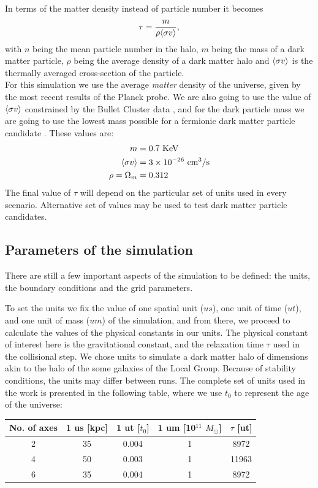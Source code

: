 In terms of the matter density instead of particle number it becomes
\begin{equation}
\tau = \frac{m}{\rho \langle \sigma v \rangle},
\end{equation}
with $n$ being the mean particle number in the halo, $m$ being the mass of a dark matter particle, $\rho$ being the average density of a dark matter halo and $\langle \sigma v \rangle$ is the thermally averaged cross-section of the particle.\\
For this simulation we use the average \emph{matter} density of the universe, given by the most recent results of the Planck probe\cite{2018arXiv180706209P}. We are also going to use the value of $\langle \sigma v \rangle$  constrained by the Bullet Cluster data \cite{2008ApJ6791173R} \cite{2017MNRAS465569R}, and for the dark particle mass we are going to use the lowest mass possible for a fermionic dark matter particle candidate \cite{mariangela}. These values are:
\begin{align}
m &= 0.7 \ \text{KeV} \\
\langle \sigma v \rangle &= 3 \times 10^{-26} \ \text{cm}^3 / \text{s}\\
\rho = \Omega_m &= 0.312  
\end{align}
The final value of $\tau$ will depend on the particular set of units used in every scenario. Alternative set of values may be used to test dark matter particle candidates.

\subsection{Parameters of the simulation}
There are still a few important aspects of the simulation to be defined: the units, the boundary conditions and the grid parameters.

To set the units we fix the value of one spatial unit ($us$), one unit of time ($ut$), and one unit of mass ($um$) of the simulation, and from there, we proceed to calculate the values of the physical constants in our units. 
The physical constant of interest here is the gravitational constant, and the relaxation time $\tau$ used in the collisional step.
We chose units to simulate a dark matter halo of dimensions akin to the halo of the some galaxies of the Local Group. Because of stability conditions, the units may differ between runs. 
The complete set of units used in the work is presented in the following table, where we use $t_0$ to represent the age of the universe:



\begin{table}[htb]
    \centering
    \label{otraTablaDelSuicidio}
	\begin{tabular}{|c|c|c|c|c| }
	\hline 
	No. of axes & 1 us [kpc] & 1 ut [$t_0$] & 1 um [10$^{11}$ $M_{\odot}$] & $\tau$ [ut] \\ \hline
	2 & 35 & 0.004 &  1 & 8972 \\ \hline
	4 & 50 & 0.003 &  1 & 11963\\ \hline
	6 & 35 & 0.004 &  1 & 8972 \\ \hline

	\end{tabular}
\end{table}



